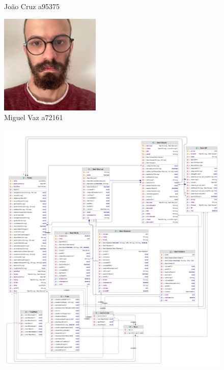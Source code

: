 \documentclass[10pt, a4paper]{article}
\begin{document}
\begin{figure}[!htb]
\begin{minipage}{0.33\textwidth}
        \caption{João Cruz a95375}
\end{minipage}\hfill
\begin{minipage}{0.30\textwidth}
        \centering
        \includegraphics[width=\linewidth]{Miguel.png}
        \caption{Miguel Vaz a72161}
\end{minipage}
\end{figure}
\newpage
\tableofcontents
\begin{figure}
        \centering
        \includegraphics[width=\textwidth]{diagram_1.png}
\end{figure}
\newpage
\end{document}
